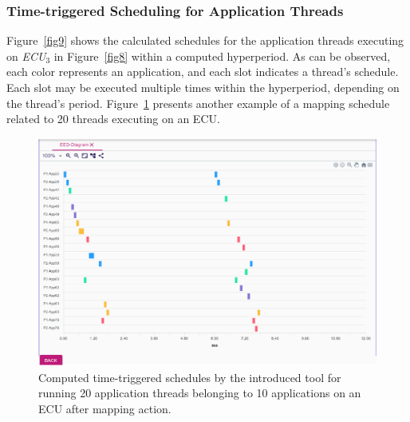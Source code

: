     \subsubsection{Time-triggered Scheduling for Application Threads}
    
         Figure~\ref{fig9} shows the calculated schedules for the application threads executing on \textit{ECU$_3$} in Figure~\ref{fig8} within a computed hyperperiod. As can be observed, each color represents an application, and each slot indicates a thread's schedule. Each slot may be executed multiple times within the hyperperiod, depending on the thread's period. Figure~\ref{fig0009} presents another example of a mapping schedule related to 20 threads executing on an ECU.  
    
    
    
       
       
       
      
        
        \begin{figure}[b!]
    	\centering
    	\includegraphics[width=0.9\columnwidth]{figures/20processes_schedule.pdf}
    	\caption{Computed time-triggered schedules by the introduced tool for running 20 application threads belonging to 10 applications on an ECU after mapping action.}
    	\label{fig0009}
        \end{figure}
        
